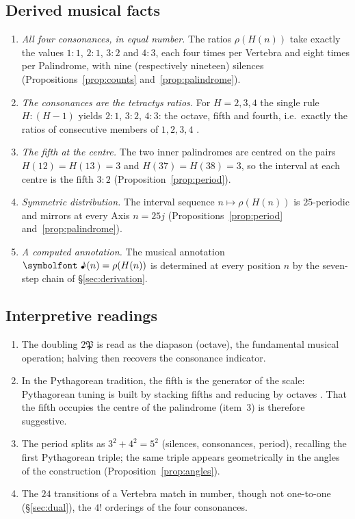 \documentclass[11pt,a4paper]{article}
\newcommand{\Pent}{\mathfrak{P}}                      %
\newcommand{\note}{\text{\symbolfont ♪}}              %
\theoremstyle{plain}
\theoremstyle{definition}
\theoremstyle{remark}
\begin{document}
\subsection{Derived musical facts}

\begin{enumerate}[itemsep=2pt]
  \item \emph{All four consonances, in equal number.} The ratios $\rho(H(n))$ take exactly the values $1:1$, $2:1$, $3:2$ and $4:3$, each four times per Vertebra and eight times per Palindrome, with nine (respectively nineteen) silences (Propositions~\ref{prop:counts} and~\ref{prop:palindrome}).
  \item \emph{The consonances are the tetractys ratios.} For $H=2,3,4$ the single rule $H:(H-1)$ yields $2:1$, $3:2$, $4:3$: the octave, fifth and fourth, i.e.\ exactly the ratios of consecutive members of $1,2,3,4$ \cite{Levin1994,Bower1989}.
  \item \emph{The fifth at the centre.} The two inner palindromes are centred on the pairs $H(12)=H(13)=3$ and $H(37)=H(38)=3$, so the interval at each centre is the fifth $3:2$ (Proposition~\ref{prop:period}).
  \item \emph{Symmetric distribution.} The interval sequence $n\mapsto\rho(H(n))$ is $25$-periodic and mirrors at every Axis $n=25j$ (Propositions~\ref{prop:period} and~\ref{prop:palindrome}).
  \item \emph{A computed annotation.} The musical annotation $\note(n)=\rho(H(n))$ is determined at every position $n$ by the seven-step chain of §\ref{sec:derivation}.
\end{enumerate}

\subsection{Interpretive readings}

\begin{enumerate}[itemsep=2pt,resume]
  \item The doubling $2\Pent$ is read as the diapason (octave), the fundamental musical operation; halving then recovers the consonance indicator.
  \item In the Pythagorean tradition, the fifth is the generator of the scale: Pythagorean tuning is built by stacking fifths and reducing by octaves \cite{Barker1989}. That the fifth occupies the centre of the palindrome (item~3) is therefore suggestive.
  \item The period splits as $3^{2}+4^{2}=5^{2}$ (silences, consonances, period), recalling the first Pythagorean triple; the same triple appears geometrically in the angles of the construction (Proposition~\ref{prop:angles}).
  \item The $24$ transitions of a Vertebra match in number, though not one-to-one (§\ref{sec:dual}), the $4!$ orderings of the four consonances.
\end{enumerate}
\end{document}
